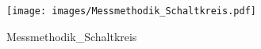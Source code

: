 %
%
%
\begin{figure}[!hb]%
    \centering
  \texttt{[image: images/Messmethodik\_Schaltkreis.pdf]}%
  \caption{Messmethodik_Schaltkreis}%
\end{figure}


